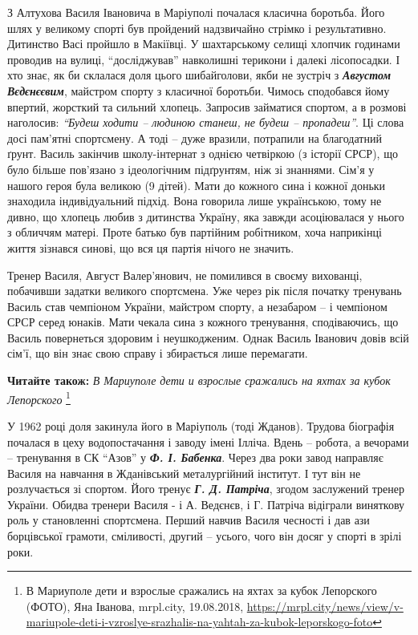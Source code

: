 З Алтухова Василя Івановича в Маріуполі почалася класична боротьба. Його шлях у
великому спорті був пройдений надзвичайно стрімко і результативно. Дитинство
Васі пройшло в Макіївці. У шахтарському селищі хлопчик годинами проводив на
вулиці, \enquote{досліджував} навколишні терикони і далекі лісопосадки. І хто знає, як
би склалася доля цього шибайголови, якби не зустріч з \emph{\textbf{Августом Вєдєнєєвим}},
майстром спорту з класичної боротьби. Чимось сподобався йому впертий, жорсткий
та сильний хлопець. Запросив займатися спортом, а в розмові наголосив: \emph{\enquote{Будеш
ходити – людиною станеш, не будеш – пропадеш}}. Ці слова досі пам'ятні
спортсмену. А тоді – дуже вразили, потрапили на благодатний ґрунт. Василь
закінчив школу-інтернат з однією четвіркою (з історії СРСР), що було більше
пов'язано з ідеологічним підґрунтям, ніж зі знаннями. Сім'я у нашого героя була
великою (9 дітей). Мати до кожного сина і кожної доньки знаходила
індивідуальний підхід. Вона говорила лише українською, тому не дивно, що
хлопець любив з дитинства Україну, яка завжди асоціювалася у нього з обличчям
матері. Проте батько був партійним робітником, хоча наприкінці життя зізнався
синові, що вся ця партія нічого не значить.


Тренер Василя, Август Валер'янович, не помилився в своєму вихованці, побачивши
задатки великого спортсмена. Уже через рік після початку тренувань Василь став
чемпіоном України, майстром спорту, а незабаром – і чемпіоном СРСР серед
юнаків. Мати чекала сина з кожного тренування, сподіваючись, що Василь
повернеться здоровим і неушкодженим. Однак Василь Іванович довів всій сім'ї, що
він знає свою справу і збирається лише перемагати.

\textbf{Читайте також:} \emph{В Мариуполе дети и взрослые сражались на яхтах за кубок Лепорского}
\footnote{В Мариуполе дети и взрослые сражались на яхтах за кубок Лепорского (ФОТО), Яна Іванова, mrpl.city, 19.08.2018, \url{https://mrpl.city/news/view/v-mariupole-deti-i-vzroslye-srazhalis-na-yahtah-za-kubok-leporskogo-foto}}

У 1962 році доля закинула його в Маріуполь (тоді Жданов). Трудова біографія
почалася в цеху водопостачання і заводу імені Ілліча. Вдень – робота, а
вечорами – тренування в СК \enquote{Азов} у \textbf{\em Ф. І. Бабенка}. Через два роки завод
направляє Василя на навчання в Жданівський металургійний інститут. І тут він не
розлучається зі спортом. Його тренує \textbf{\emph{Г. Д. Патріча}}, згодом заслужений тренер
України. Обидва тренери Василя - і А. Ведєнєв, і Г. Патріча відіграли виняткову
роль у становленні спортсмена. Перший навчив Василя чесності і дав ази
борцівської грамоти, сміливості, другий – усього, чого він досяг у спорті в
зрілі роки.

